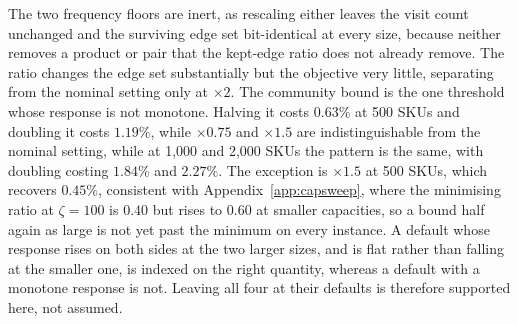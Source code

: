 \documentclass[]{interact}
\begin{document}
The two frequency floors are inert, as rescaling either leaves the visit count unchanged and the surviving edge set bit-identical at every size, because neither removes a product or pair that the kept-edge ratio does not already remove. The ratio changes the edge set substantially but the objective very little, separating from the nominal setting only at $\times2$. The community bound is the one threshold whose response is not monotone. Halving it costs $0.63\%$ at 500 SKUs and doubling it costs $1.19\%$, while $\times0.75$ and $\times1.5$ are indistinguishable from the nominal setting, while at 1,000 and 2,000 SKUs the pattern is the same, with doubling costing $1.84\%$ and $2.27\%$. The exception is $\times1.5$ at 500 SKUs, which recovers $0.45\%$, consistent with Appendix~\ref{app:capsweep}, where the minimising ratio at $\zeta=100$ is $0.40$ but rises to $0.60$ at smaller capacities, so a bound half again as large is not yet past the minimum on every instance. A default whose response rises on both sides at the two larger sizes, and is flat rather than falling at the smaller one, is indexed on the right quantity, whereas a default with a monotone response is not. Leaving all four at their defaults is therefore supported here, not assumed.
\end{document}
